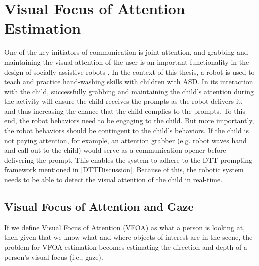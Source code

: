 \section{Visual Focus of Attention Estimation}
One of the key initiators of communication is joint attention, and grabbing and maintaining the visual attention of the user is an important functionality in the design of socially assistive robots \cite{torta2012can}.  In the context of this thesis, a robot is used to teach and practice hand-washing skills with children with ASD.  In its interaction with the child, successfully grabbing and maintaining the child's attention during the activity will ensure the child receives the prompts as the robot delivers it, and thus increasing the chance that the child complies to the prompts.  To this end, the robot behaviors need to be engaging to the child.  But more importantly, the robot behaviors should be contingent to the child's behaviors.  If the child is not paying attention, for example, an attention grabber (e.g. robot waves hand and call out to the child) would serve as a communication opener before delivering the prompt.  This enables the system to adhere to the DTT prompting framework mentioned in \ref{DTTDiscussion}.  Because of this, the robotic system needs to be able to detect the visual attention of the child in real-time.

\subsection{Visual Focus of Attention and Gaze}
If we define Visual Focus of Attention (VFOA) as what a person is looking at, then given that we know what and where objects of interest are in the scene, the problem for VFOA estimation becomes estimating the direction and depth of a person's visual focus (i.e., gaze).

